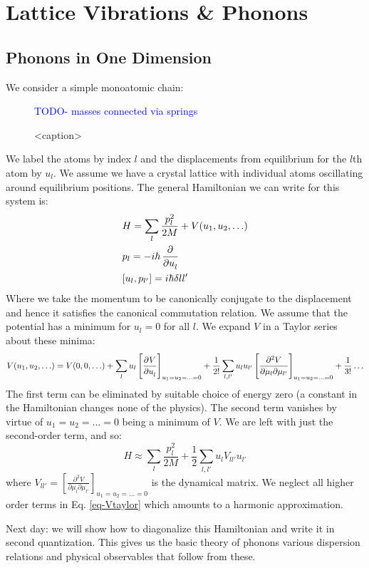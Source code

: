 \section{Lattice Vibrations \& Phonons}
\subsection{Phonons in One Dimension}
We consider a simple monoatomic chain:
\begin{figure}[htbp]
    \centering
    \textcolor{blue}{TODO- masses connected via springs}
    \caption{<caption>}
    \label{<label>}
\end{figure}
We label the atoms by index $l$ and the displacements from equilibrium for the $l$th atom by $u_l$. We assume we have a crystal lattice with individual atoms oscillating around equilibrium positions. The general Hamiltonian we can write for this system is:
\begin{equation}
    \begin{split}
        &H = \sum_l \frac{p_l^2}{2M} + V(u_1, u_2, \ldots)
        \\ &p_l = -i\hbar\dpd{}{u_l}
        \\ &[u_l, p_{l'}] = i\hbar\delta{ll'} 
    \end{split}
\end{equation}
Where we take the momentum to be canonically conjugate to the displacement and hence it satisfies the canonical commutation relation. We assume that the potential has a minimum for $u_l = 0$ for all $l$. We expand $V$ in a Taylor series about these minima:
\begin{equation}\label{eq-Vtaylor}
    V(u_1, u_2, \ldots) = V(0, 0, \ldots ) + \sum_l u_l \left[\dpd{V}{u_l}\right]_{u_1=u_2=\ldots = 0} + \frac{1}{2!}\sum_{l, l'}u_lu_{l'}\left[\frac{\partial^2 V}{\partial \mu_l \partial \mu_{l'}}\right]_{u_1=u_2=\ldots=0} + \frac{1}{3!} \ldots
\end{equation}
The first term can be eliminated by suitable choice of energy zero (a constant in the Hamiltonian changes none of the physics). The second term vanishes by virtue of $u_1 = u_2 = \ldots = 0$ being a minimum of $V$. We are left with just the second-order term, and so:
\begin{equation}
    H \approx \sum_l \frac{p_l^2}{2M} + \frac{1}{2}\sum_{l, l'}u_l V_{ll'}u_{l'}
\end{equation}
where $V_{ll'} = \left[\frac{\partial^2 V}{\partial \mu_l \partial \mu_{l'}}\right]_{u_1=u_2=\ldots=0}$ is the dynamical matrix. We neglect all higher order terms in Eq. \eqref{eq-Vtaylor} which amounts to a harmonic approximation.

Next day: we will show how to diagonalize this Hamiltonian and write it in second quantization. This gives us the basic theory of phonons various dispersion relations and physical observables that follow from these.